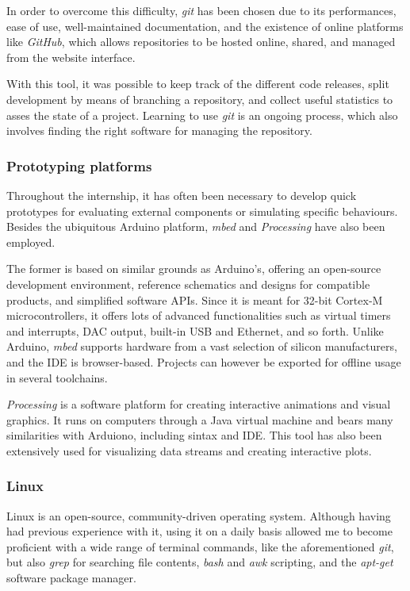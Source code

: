 In order to overcome this difficulty, \emph{git} has been chosen due to its performances, ease of use, well-maintained documentation, and the existence of online platforms like \emph{GitHub}, which allows repositories to be hosted online, shared, and managed from the website interface.

With this tool, it was possible to keep track of the different code releases, split development by means of branching a repository, and collect useful statistics to asses the state of a project.
Learning to use \emph{git} is an ongoing process, which also involves finding the right software for managing the repository.


\subsubsection{Prototyping platforms}
Throughout the internship, it has often been necessary to develop quick prototypes for evaluating external components or simulating specific behaviours.
Besides the ubiquitous Arduino platform, \emph{mbed} and \emph{Processing} have also been employed.

The former is based on similar grounds as Arduino's, offering an open-source development environment, reference schematics and designs for compatible products, and simplified software APIs.
Since it is meant for 32-bit Cortex-M microcontrollers, it offers lots of advanced functionalities such as virtual timers and interrupts, DAC output, built-in USB and Ethernet, and so forth.
Unlike Arduino, \emph{mbed} supports hardware from a vast selection of silicon manufacturers, and the IDE is browser-based. 
Projects can however be exported for offline usage in several toolchains.

\emph{Processing} is a software platform for creating interactive animations and visual graphics.
It runs on computers through a Java virtual machine and bears many similarities with Arduiono, including sintax and IDE.
This tool has also been extensively used for visualizing data streams and creating interactive plots.


\subsubsection{Linux}
Linux is an open-source, community-driven operating system.
Although having had previous experience with it, using it on a daily basis allowed me to become proficient with a wide range of terminal commands, like the aforementioned \emph{git}, but also \emph{grep} for searching file contents, \emph{bash} and \emph{awk} scripting, and the \emph{apt-get} software package manager.

